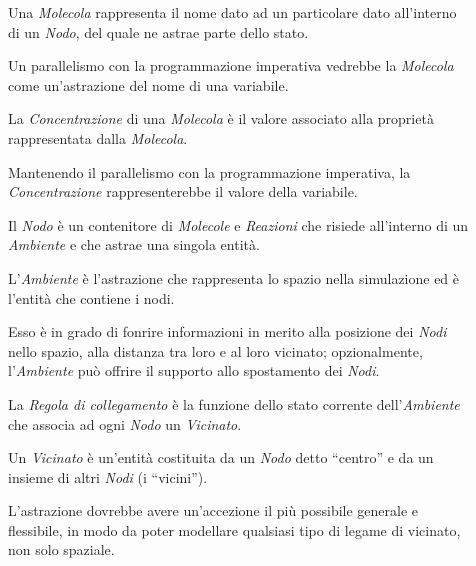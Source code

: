             \begin{description}
                \item[\label{itm:mol}]
                    Una \emph{Molecola} rappresenta il nome dato ad un particolare dato all'interno di un \emph{Nodo}, del quale ne astrae parte dello stato.

                    Un parallelismo con la programmazione imperativa vedrebbe la \emph{Molecola} come un'astrazione del nome di una variabile.

                \item[\label{itm:conc}]
                    La \emph{Concentrazione} di una \emph{Molecola} è il valore associato alla proprietà rappresentata dalla \emph{Molecola}.

                    Mantenendo il parallelismo con la programmazione imperativa, la \emph{Concentrazione} rappresenterebbe il valore della variabile.

                \item[\label{itm:node}]
                    Il \emph{Nodo} è un contenitore di \emph{Molecole} e \emph{Reazioni} che risiede all'interno di un \emph{Ambiente} e che astrae una singola entità.

                \item[\label{itm:env}]
                    L'\emph{Ambiente} è l'astrazione che rappresenta lo spazio nella simulazione ed è l'entità che contiene i nodi.

                    Esso è in grado di fonrire informazioni in merito alla posizione dei \emph{Nodi} nello spazio, alla distanza tra loro e al loro vicinato; opzionalmente, l'\emph{Ambiente} può offrire il supporto allo spostamento dei \emph{Nodi}.

                \item[\label{itm:linkr}]
                    La \emph{Regola di collegamento} è la funzione dello stato corrente dell'\emph{Ambiente} che associa ad ogni \emph{Nodo} un \emph{Vicinato}.

                \item[\label{itm:neigh}]
                    Un \emph{Vicinato} è un'entità costituita da un \emph{Nodo} detto ``centro'' e da un insieme di altri \emph{Nodi} (i ``vicini'').

                    L'astrazione dovrebbe avere un'accezione il più possibile generale e flessibile, in modo da poter modellare qualsiasi tipo di legame di vicinato, non solo spaziale.


\end{description}
